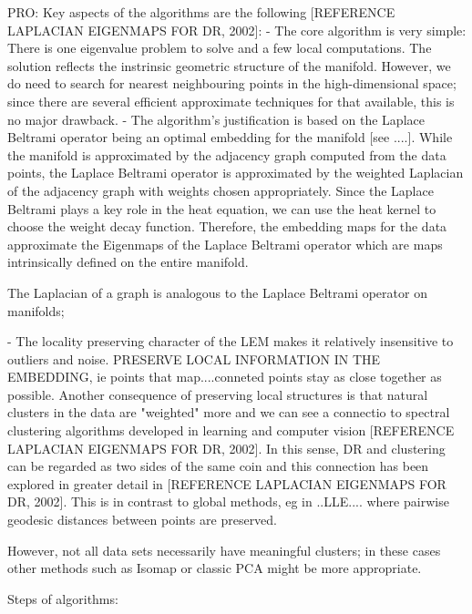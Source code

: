 PRO:
Key aspects of the algorithms are the following [REFERENCE LAPLACIAN EIGENMAPS FOR DR, 2002]:
- The core algorithm is very simple: There is one eigenvalue problem to solve and a few local computations. The solution reflects the instrinsic geometric structure of the manifold. However, we do need to search for nearest neighbouring points in the high-dimensional space; since there are several efficient approximate techniques for that available, this is no major drawback.
- The algorithm's justification is based on the Laplace Beltrami operator being an optimal embedding for the manifold [see ....]. 
While the manifold is approximated by the adjacency graph computed from the data points, the Laplace Beltrami operator is approximated by the weighted Laplacian of the adjacency graph with weights chosen appropriately. %
Since the Laplace Beltrami plays a key role in the heat equation, we can use the heat kernel to choose the weight decay function. Therefore, the embedding maps for the data approximate the Eigenmaps of the Laplace Beltrami operator which are maps intrinsically defined on the entire manifold.

The Laplacian of a graph is analogous to the Laplace Beltrami operator on manifolds; 

- The locality preserving character of the LEM makes it relatively insensitive to outliers and noise. 
PRESERVE LOCAL INFORMATION IN THE EMBEDDING, ie points that map....conneted points stay as close together as possible.
Another consequence of preserving local structures  is that natural clusters in the data are "weighted" more and we can see a connectio to spectral clustering algorithms developed in learning and computer vision [REFERENCE LAPLACIAN EIGENMAPS FOR DR, 2002].
In this sense, DR and clustering can be regarded as two sides of the same coin and this connection has been explored in greater detail in [REFERENCE LAPLACIAN EIGENMAPS FOR DR, 2002]. 
This is in contrast to global methods, eg in ..LLE.... where pairwise geodesic distances between points are preserved.


However, not all data sets necessarily have meaningful clusters; in these cases other methods such as Isomap or classic PCA might be more appropriate. 

Steps of algorithms:

